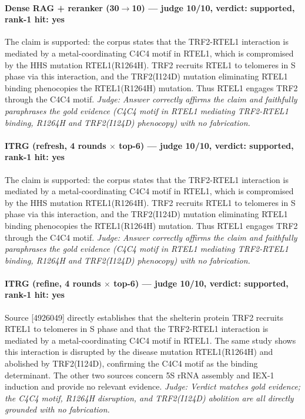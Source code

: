\documentclass[sigconf, review, anonymous]{acmart}
\begin{document}
\paragraph{Dense RAG + reranker (30$\to$10) --- judge 10/10, verdict: supported, rank-1 hit: yes}
\noindent The claim is supported: the corpus states that the TRF2-RTEL1 interaction is mediated by a metal-coordinating C4C4 motif in RTEL1, which is compromised by the HHS mutation RTEL1(R1264H). TRF2 recruits RTEL1 to telomeres in S phase via this interaction, and the TRF2(I124D) mutation eliminating RTEL1 binding phenocopies the RTEL1(R1264H) mutation. Thus RTEL1 engages TRF2 through the C4C4 motif.
\noindent\small\textit{Judge: Answer correctly affirms the claim and faithfully paraphrases the gold evidence (C4C4 motif in RTEL1 mediating TRF2-RTEL1 binding, R1264H and TRF2(I124D) phenocopy) with no fabrication.}
\paragraph{ITRG (refresh, 4 rounds $\times$ top-6) --- judge 10/10, verdict: supported, rank-1 hit: yes}
\noindent The claim is supported: the corpus states that the TRF2-RTEL1 interaction is mediated by a metal-coordinating C4C4 motif in RTEL1, which is compromised by the HHS mutation RTEL1(R1264H). TRF2 recruits RTEL1 to telomeres in S phase via this interaction, and the TRF2(I124D) mutation eliminating RTEL1 binding phenocopies the RTEL1(R1264H) mutation. Thus RTEL1 engages TRF2 through the C4C4 motif.
\noindent\small\textit{Judge: Answer correctly affirms the claim and faithfully paraphrases the gold evidence (C4C4 motif in RTEL1 mediating TRF2-RTEL1 binding, R1264H and TRF2(I124D) phenocopy) with no fabrication.}
\paragraph{ITRG (refine, 4 rounds $\times$ top-6) --- judge 10/10, verdict: supported, rank-1 hit: yes}
\noindent Source [4926049] directly establishes that the shelterin protein TRF2 recruits RTEL1 to telomeres in S phase and that the TRF2-RTEL1 interaction is mediated by a metal-coordinating C4C4 motif in RTEL1. The same study shows this interaction is disrupted by the disease mutation RTEL1(R1264H) and abolished by TRF2(I124D), confirming the C4C4 motif as the binding determinant. The other two sources concern 5S rRNA assembly and IEX-1 induction and provide no relevant evidence.
\noindent\small\textit{Judge: Verdict matches gold evidence; the C4C4 motif, R1264H disruption, and TRF2(I124D) abolition are all directly grounded with no fabrication.}
\end{document}
